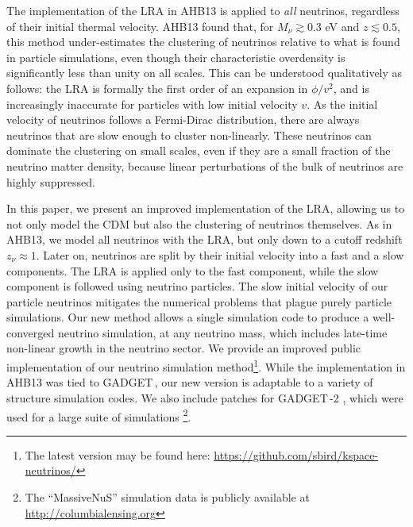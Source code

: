 \documentclass[useAMS, usenatbib]{mnras}
\newcommand{\gadget}{{\small GADGET\,}}
\newcommand{\spb}[1]{{\textcolor{green}{[{\bf SPB}: #1]}}}
\begin{document}
The implementation of the LRA in AHB13 is applied to \emph{all} neutrinos, regardless of their initial thermal velocity. AHB13 found that, for $M_\nu \gtrsim 0.3$ eV and $z \lesssim 0.5$, this method under-estimates the clustering of neutrinos relative to what is found in particle simulations, even though their characteristic overdensity is significantly less than unity on all scales. This can be understood qualitatively as follows: the LRA is formally the first order of an expansion in $\phi/v^2$, and is increasingly inaccurate for particles with low initial velocity $v$. As the initial velocity of neutrinos follows a Fermi-Dirac distribution, there are always neutrinos that are slow enough to cluster non-linearly. These neutrinos can dominate the clustering on small scales, even if they are a small fraction of the neutrino matter density, because linear perturbations of the bulk of neutrinos are highly suppressed. %

In this paper, we present an improved implementation of the LRA, allowing us to not only model the CDM but also the clustering of neutrinos themselves.  %
As in AHB13, we model all neutrinos with the LRA, but only down to a cutoff redshift $z_\nu \approx 1$. Later on, neutrinos are split by their initial velocity into a fast and a slow components. The LRA is applied only to the fast component, while the slow component is followed using neutrino particles. The slow initial velocity of our particle neutrinos mitigates the numerical problems that plague purely particle simulations. Our new method allows a single simulation code to produce a well-converged neutrino simulation, at any neutrino mass, which includes late-time non-linear growth in the neutrino sector. %
We provide an improved public implementation of our neutrino simulation
method\footnote{The latest version may be found here: \url{https://github.com/sbird/kspace-neutrinos/}}.
While the implementation in AHB13 was tied to \gadget \citep{Springel_2005}, our new version is adaptable to a variety of structure simulation codes. We also include patches for \gadget-2 \citep{Springel_2005}, which were used for a large suite of simulations \cite[``MassiveNuS'': ][]{Liu_2017}\footnote{The ``MassiveNuS'' simulation data is publicly available at \url{http://columbialensing.org}}.
\end{document}
